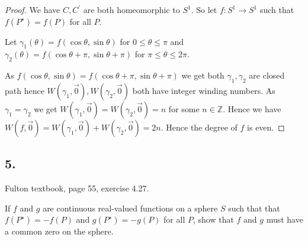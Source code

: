 \documentclass{amsart}
\theoremstyle{plain}
\theoremstyle{definition}
\theoremstyle{remark}
\begin{document}
\begin{proof}
We have $C,C^\prime$ are both homeomorphic to $S^1$. So let $f:S^1\to S^1$ such that $f(P^\star)=f(P)$ for all $P$. 

Let $\gamma_1(\theta)=f(\cos \theta ,\sin \theta )$ for $0\leq \theta \leq \pi $ and $\gamma_2(\theta)=f(\cos \theta +\pi , \sin \theta+\pi)$ for $\pi \leq \theta \leq 2\pi$. 

As $f(\cos \theta,\sin \theta )=f(\cos \theta+\pi,\sin \theta+\pi)$ we get both $\gamma_1,\gamma_2$ are closed path hence $W(\gamma_1,\vec 0),W(\gamma_2,\vec 0)$ both have integer winding numbers. As $\gamma_1=\gamma_2$ we get $W(\gamma_1,\vec 0)=W(\gamma_2,\vec 0)=n$ for some $n\in \mathbb Z$. Hence we have $W(f,\vec 0)=W(\gamma_1,\vec 0)+W(\gamma_2,\vec 0)=2n$. Hence the degree of $f$ is even.

\end{proof}

\vspace{.15in}
\noindent
\subsection*{5.} Fulton textbook, page 55, exercise 4.27.

If $f$ and $g$ are continuous real-valued functions on a sphere $S$ such that that $f(P^\star)=-f(P)$ and $g(P^\star)=-g(P)$ for all $P$, show that $f$ and $g$ must have a common zero on the sphere. 


 
\end{document}
